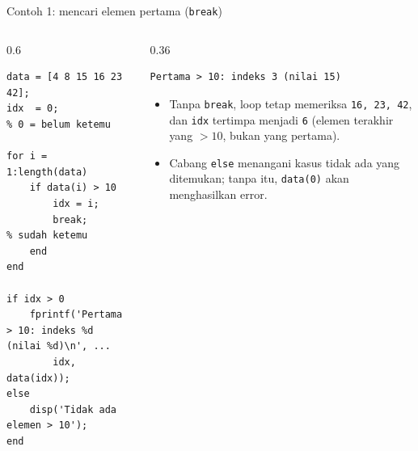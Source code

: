 \documentclass[aspectratio=169,10pt]{beamer}
\newcommand{\codesize}{\footnotesize}
\newcommand{\kode}[1]{\texttt{#1}}
\begin{document}
\begin{frame}[fragile]{Contoh 1: mencari elemen pertama \hfill\small(\kode{break})}
  \renewcommand{\codesize}{\scriptsize}
  \begin{columns}[T]
    \begin{column}{0.6\textwidth}
\begin{lstlisting}
data = [4 8 15 16 23 42];
idx  = 0;                % 0 = belum ketemu

for i = 1:length(data)
    if data(i) > 10
        idx = i;
        break;           % sudah ketemu
    end
end

if idx > 0
    fprintf('Pertama > 10: indeks %d (nilai %d)\n', ...
        idx, data(idx));
else
    disp('Tidak ada elemen > 10');
end
\end{lstlisting}
    \end{column}
    \begin{column}{0.36\textwidth}
\begin{lstlisting}[style=out]
Pertama > 10: indeks 3 (nilai 15)
\end{lstlisting}
      \vspace{4pt}
      \scriptsize
      \begin{itemize}
        \item Tanpa \kode{break}, loop tetap memeriksa \kode{16, 23, 42}, dan \kode{idx} tertimpa menjadi
              \kode{6} (elemen \alert{terakhir} yang $>10$, bukan yang pertama).
        \item Cabang \kode{else} menangani kasus tidak ada yang ditemukan; tanpa itu, \kode{data(0)}
              akan menghasilkan error.
      \end{itemize}
    \end{column}
  \end{columns}
\end{frame}
\end{document}
